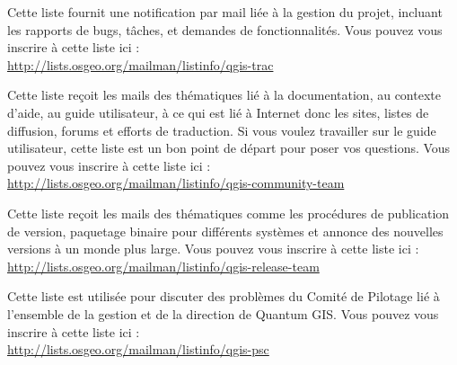 Cette liste fournit une notification par mail li\'ee \`a la gestion du projet,
incluant les rapports de bugs, t\^aches, et demandes de fonctionnalit\'es. Vous
pouvez vous inscrire \`a cette liste ici :\\
\url{http://lists.osgeo.org/mailman/listinfo/qgis-trac}

Cette liste re\c{c}oit les mails des th\'ematiques li\'e \`a la documentation, au
contexte d'aide, au guide utilisateur, \`a ce qui est li\'e \`a Internet donc les
sites, listes de diffusion, forums et efforts de traduction. Si vous voulez
travailler sur le guide utilisateur, cette liste est un bon point de d\'epart
pour poser vos questions. Vous pouvez vous inscrire \`a cette liste ici :\\
\url{http://lists.osgeo.org/mailman/listinfo/qgis-community-team}

Cette liste re\c{c}oit les mails des th\'ematiques comme les proc\'edures de
publication de version, paquetage binaire pour diff\'erents syst\`emes et annonce
des nouvelles versions \`a un monde plus large. Vous pouvez vous inscrire \`a cette
liste ici :\\
\url{http://lists.osgeo.org/mailman/listinfo/qgis-release-team}

Cette liste est utilis\'ee pour discuter des probl\`emes du Comit\'e de Pilotage li\'e \`a
l'ensemble de la gestion et de la direction de Quantum GIS. Vous pouvez vous
inscrire \`a cette liste ici :\\
\url{http://lists.osgeo.org/mailman/listinfo/qgis-psc}

